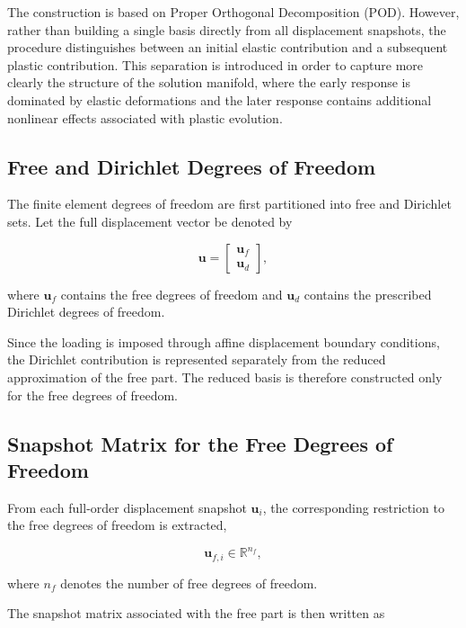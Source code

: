 \documentclass[11pt,a4paper]{article}
\begin{document}
The construction is based on Proper Orthogonal Decomposition (POD). However, rather than building a single basis directly from all displacement snapshots, the procedure distinguishes between an initial elastic contribution and a subsequent plastic contribution. This separation is introduced in order to capture more clearly the structure of the solution manifold, where the early response is dominated by elastic deformations and the later response contains additional nonlinear effects associated with plastic evolution.

\subsection{Free and Dirichlet Degrees of Freedom}

The finite element degrees of freedom are first partitioned into free and Dirichlet sets. Let the full displacement vector be denoted by

\begin{equation}
\mathbf{u} =
\begin{bmatrix}
\mathbf{u}_f \\
\mathbf{u}_d
\end{bmatrix},
\end{equation}

where $\mathbf{u}_f$ contains the free degrees of freedom and $\mathbf{u}_d$ contains the prescribed Dirichlet degrees of freedom.

Since the loading is imposed through affine displacement boundary conditions, the Dirichlet contribution is represented separately from the reduced approximation of the free part. The reduced basis is therefore constructed only for the free degrees of freedom.

\subsection{Snapshot Matrix for the Free Degrees of Freedom}

From each full-order displacement snapshot $\mathbf{u}_i$, the corresponding restriction to the free degrees of freedom is extracted,

\begin{equation}
\mathbf{u}_{f,i} \in \mathbb{R}^{n_f},
\end{equation}

where $n_f$ denotes the number of free degrees of freedom.

The snapshot matrix associated with the free part is then written as
\end{document}

